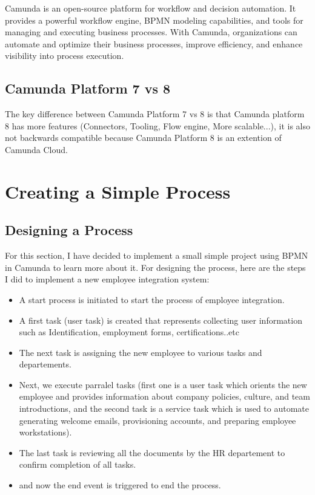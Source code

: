 \documentclass[12pt]{article}
\begin{document}
{  Camunda is an open-source platform for workflow and decision automation. It provides a powerful workflow engine, BPMN modeling capabilities, and tools for managing and executing business processes. With Camunda, organizations can automate and optimize their business processes, improve efficiency, and enhance visibility into process execution.

  \subsection{Camunda Platform 7 vs 8}

  The key difference between Camunda Platform 7 vs 8 is that Camunda platform 8 has more features (Connectors, Tooling, Flow engine, More scalable...), it is also not backwards compatible because Camunda Platform 8 is an extention of Camunda Cloud.

  \section{Creating a Simple Process}

  \subsection{Designing a Process}

  For this section, I have decided to implement a small simple project using BPMN in Camunda to learn more about it.
  For designing the process, here are the steps I did to implement a new employee integration system:

  \begin{itemize}[noitemsep,nolistsep]
    \item A start process is initiated to start the process of employee integration.
    \item A first task (user task) is created that represents collecting user information such as Identification, employment forms, certifications..etc
    \item The next task is assigning the new employee to various tasks and departements.
    \item Next, we execute parralel tasks (first one is a user task which orients the new employee and provides information about company policies, culture, and team introductions, and the second task is a service task which is used to automate generating welcome emails, provisioning accounts, and preparing employee workstations).
    \item The last task is reviewing all the documents by the HR departement to confirm completion of all tasks.
    \item and now the end event is triggered to end the process.
  \end{itemize}

}
\end{document}

